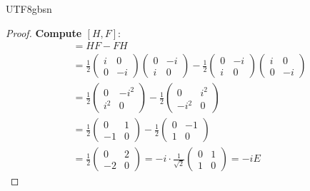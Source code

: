 \documentclass[a4paper,12pt]{extarticle}
\theoremstyle{definition}
\begin{document}
\begin{CJK}{UTF8}{gbsn}
\begin{proof}
\textbf{Compute $[H, F]$}:
\begin{align}
[H, F] &= HF - FH\\
&= \frac{1}{2}\begin{pmatrix} i & 0 \\ 0 & -i \end{pmatrix}\begin{pmatrix} 0 & -i \\ i & 0 \end{pmatrix} - \frac{1}{2}\begin{pmatrix} 0 & -i \\ i & 0 \end{pmatrix}\begin{pmatrix} i & 0 \\ 0 & -i \end{pmatrix}\\
&= \frac{1}{2}\begin{pmatrix} 0 & -i^2 \\ i^2 & 0 \end{pmatrix} - \frac{1}{2}\begin{pmatrix} 0 & i^2 \\ -i^2 & 0 \end{pmatrix}\\
&= \frac{1}{2}\begin{pmatrix} 0 & 1 \\ -1 & 0 \end{pmatrix} - \frac{1}{2}\begin{pmatrix} 0 & -1 \\ 1 & 0 \end{pmatrix}\\
&= \frac{1}{2}\begin{pmatrix} 0 & 2 \\ -2 & 0 \end{pmatrix} = -i \cdot \frac{1}{\sqrt{2}}\begin{pmatrix} 0 & 1 \\ 1 & 0 \end{pmatrix} = -iE
\end{align}


\end{proof}
\end{CJK}
\end{document}
